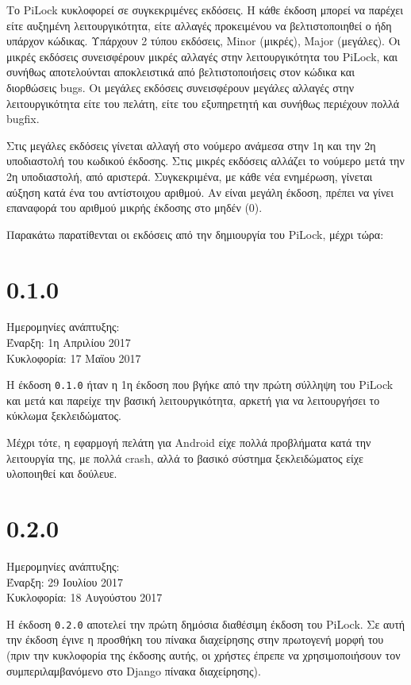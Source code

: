 Το PiLock κυκλοφορεί σε συγκεκριμένες εκδόσεις. Η κάθε έκδοση μπορεί να παρέχει είτε αυξημένη λειτουργικότητα, είτε αλλαγές προκειμένου να βελτιστοποιηθεί ο ήδη υπάρχον κώδικας. Υπάρχουν 2 τύπου εκδόσεις, Minor (μικρές), Major (μεγάλες). Οι μικρές εκδόσεις συνεισφέρουν μικρές αλλαγές στην λειτουργικότητα του PiLock, και συνήθως αποτελούνται αποκλειστικά από βελτιστοποιήσεις στον κώδικα και διορθώσεις bugs. Οι μεγάλες εκδόσεις συνεισφέρουν μεγάλες αλλαγές στην λειτουργικότητα είτε του πελάτη, είτε του εξυπηρετητή και συνήθως περιέχουν πολλά bugfix.

Στις μεγάλες εκδόσεις γίνεται αλλαγή στο νούμερο ανάμεσα στην 1η και την 2η υποδιαστολή του κωδικού έκδοσης. Στις μικρές εκδόσεις αλλάζει το νούμερο μετά την 2η υποδιαστολή, από αριστερά. Συγκεκριμένα, με κάθε νέα ενημέρωση, γίνεται αύξηση κατά ένα του αντίστοιχου αριθμού. Αν είναι μεγάλη έκδοση, πρέπει να γίνει επαναφορά του αριθμού μικρής έκδοσης στο μηδέν (0).

Παρακάτω παρατίθενται οι εκδόσεις από την δημιουργία του PiLock, μέχρι τώρα:

\section{0.1.0}
	Ημερομηνίες ανάπτυξης:\\Έναρξη: 1η Απριλίου 2017\\Κυκλοφορία: 17 Μαϊου 2017

	Η έκδοση \verb|0.1.0| ήταν η 1η έκδοση που βγήκε από την πρώτη σύλληψη του PiLock και μετά και παρείχε την βασική λειτουργικότητα, αρκετή για να λειτουργήσει το κύκλωμα ξεκλειδώματος. 

	Μέχρι τότε, η εφαρμογή πελάτη για Android είχε πολλά προβλήματα κατά την λειτουργία της, με πολλά crash, αλλά το βασικό σύστημα ξεκλειδώματος είχε υλοποιηθεί και δούλευε.

\section{0.2.0}
	Ημερομηνίες ανάπτυξης:\\Έναρξη: 29 Ιουλίου 2017\\Κυκλοφορία: 18 Αυγούστου 2017

	Η έκδοση \verb|0.2.0| αποτελεί την πρώτη δημόσια διαθέσιμη έκδοση του PiLock. Σε αυτή την έκδοση έγινε η προσθήκη του πίνακα διαχείρησης στην πρωτογενή μορφή του (πριν την κυκλοφορία της έκδοσης αυτής, οι χρήστες έπρεπε να χρησιμοποιήσουν τον συμπεριλαμβανόμενο στο Django πίνακα διαχείρησης).

